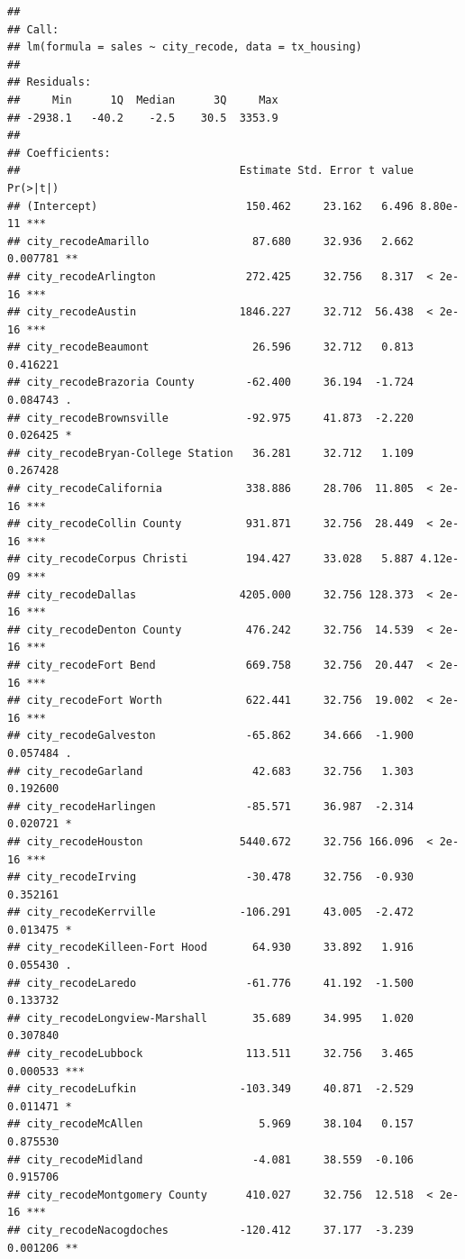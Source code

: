 \documentclass[]{book}
\begin{document}
\begin{verbatim}
## 
## Call:
## lm(formula = sales ~ city_recode, data = tx_housing)
## 
## Residuals:
##     Min      1Q  Median      3Q     Max 
## -2938.1   -40.2    -2.5    30.5  3353.9 
## 
## Coefficients:
##                                  Estimate Std. Error t value Pr(>|t|)    
## (Intercept)                       150.462     23.162   6.496 8.80e-11 ***
## city_recodeAmarillo                87.680     32.936   2.662 0.007781 ** 
## city_recodeArlington              272.425     32.756   8.317  < 2e-16 ***
## city_recodeAustin                1846.227     32.712  56.438  < 2e-16 ***
## city_recodeBeaumont                26.596     32.712   0.813 0.416221    
## city_recodeBrazoria County        -62.400     36.194  -1.724 0.084743 .  
## city_recodeBrownsville            -92.975     41.873  -2.220 0.026425 *  
## city_recodeBryan-College Station   36.281     32.712   1.109 0.267428    
## city_recodeCalifornia             338.886     28.706  11.805  < 2e-16 ***
## city_recodeCollin County          931.871     32.756  28.449  < 2e-16 ***
## city_recodeCorpus Christi         194.427     33.028   5.887 4.12e-09 ***
## city_recodeDallas                4205.000     32.756 128.373  < 2e-16 ***
## city_recodeDenton County          476.242     32.756  14.539  < 2e-16 ***
## city_recodeFort Bend              669.758     32.756  20.447  < 2e-16 ***
## city_recodeFort Worth             622.441     32.756  19.002  < 2e-16 ***
## city_recodeGalveston              -65.862     34.666  -1.900 0.057484 .  
## city_recodeGarland                 42.683     32.756   1.303 0.192600    
## city_recodeHarlingen              -85.571     36.987  -2.314 0.020721 *  
## city_recodeHouston               5440.672     32.756 166.096  < 2e-16 ***
## city_recodeIrving                 -30.478     32.756  -0.930 0.352161    
## city_recodeKerrville             -106.291     43.005  -2.472 0.013475 *  
## city_recodeKilleen-Fort Hood       64.930     33.892   1.916 0.055430 .  
## city_recodeLaredo                 -61.776     41.192  -1.500 0.133732    
## city_recodeLongview-Marshall       35.689     34.995   1.020 0.307840    
## city_recodeLubbock                113.511     32.756   3.465 0.000533 ***
## city_recodeLufkin                -103.349     40.871  -2.529 0.011471 *  
## city_recodeMcAllen                  5.969     38.104   0.157 0.875530    
## city_recodeMidland                 -4.081     38.559  -0.106 0.915706    
## city_recodeMontgomery County      410.027     32.756  12.518  < 2e-16 ***
## city_recodeNacogdoches           -120.412     37.177  -3.239 0.001206 ** 

\end{verbatim}
\end{document}
